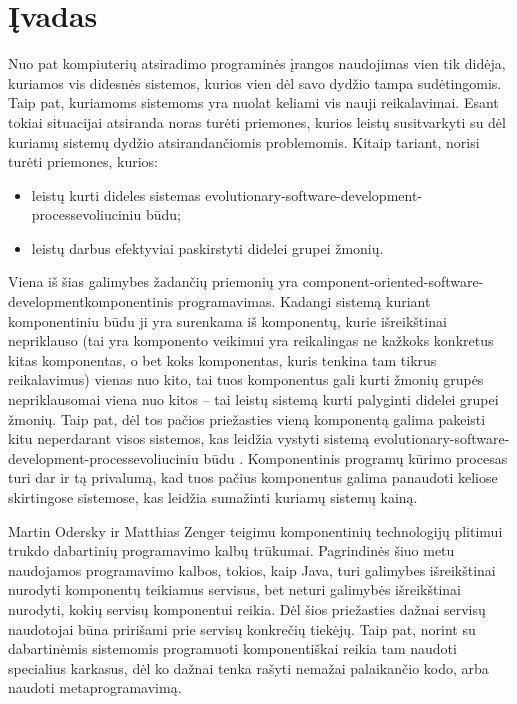 \chapter{Įvadas}

Nuo pat kompiuterių atsiradimo programinės įrangos naudojimas vien
tik didėja, kuriamos vis didesnės sistemos, kurios vien dėl
savo dydžio tampa sudėtingomis. Taip pat, kuriamoms sistemoms yra
nuolat keliami vis nauji reikalavimai. Esant tokiai situacijai
atsiranda noras turėti priemones, kurios leistų susitvarkyti
su dėl kuriamų sistemų dydžio atsirandančiomis problemomis. Kitaip
tariant, norisi turėti priemones, kurios:
\begin{itemize}
  \item leistų kurti dideles sistemas
    \gls{evolutionary-software-development-process}{evoliuciniu būdu};
  \item leistų darbus efektyviai paskirstyti didelei grupei žmonių.
\end{itemize}

Viena iš šias galimybes žadančių priemonių yra
\gls{component-oriented-software-development}{komponentinis programavimas}.
Kadangi sistemą kuriant komponentiniu būdu ji yra surenkama iš
komponentų, kurie išreikštinai nepriklauso (tai yra komponento
veikimui yra reikalingas ne kažkoks konkretus kitas komponentas, o
bet koks komponentas, kuris tenkina tam tikrus reikalavimus) vienas nuo
kito, tai tuos komponentus gali kurti žmonių grupės nepriklausomai
viena nuo kitos – tai leistų sistemą kurti palyginti didelei grupei
žmonių. Taip pat, dėl tos pačios priežasties vieną komponentą galima
pakeisti kitu neperdarant visos sistemos, kas leidžia vystyti
sistemą \gls{evolutionary-software-development-process}{evoliuciniu būdu}%
\cite[6]{cs-beyond-object-oriented-programming}. Komponentinis programų
kūrimo procesas turi dar ir tą privalumą, kad tuos pačius komponentus
galima panaudoti keliose skirtingose sistemose, kas leidžia sumažinti
kuriamų sistemų kainą\cite[6]{cs-beyond-object-oriented-programming}.

Martin Odersky ir Matthias Zenger teigimu komponentinių technologijų
plitimui trukdo dabartinių programavimo kalbų
trūkumai\cite{scalable-component-abstractions, odersky:scala-experiment}.
Pagrindinės šiuo metu naudojamos programavimo kalbos, tokios, kaip
Java, turi galimybes išreikštinai nurodyti komponentų teikiamus
servisus, bet neturi galimybės išreikštinai nurodyti, kokių servisų
komponentui reikia. Dėl šios priežasties dažnai servisų naudotojai
būna pririšami prie servisų konkrečių
tiekėjų\cite{scalable-component-abstractions}. Taip pat, norint
su dabartinėmis sistemomis programuoti komponentiškai reikia
tam naudoti specialius karkasus, dėl ko dažnai tenka rašyti
nemažai palaikančio  kodo, arba naudoti
metaprogramavimą\cite{extensible-software-components}.

